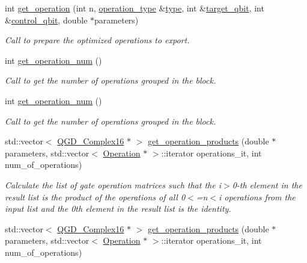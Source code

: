 \begin{DoxyCompactItemize}
int \hyperlink{class_decomposition___base_a64e2b692d38fe3ccbd49708d8fa24493}{get\+\_\+operation} (int n, \hyperlink{operations_2include_2_operation_8h_ad99e62941c8e4b13e5fc45ecaaf65eff}{operation\+\_\+type} \&\hyperlink{class_operation_ad47c56c86d62a4c775571e1600416479}{type}, int \&\hyperlink{class_operation_a3e489b72c124b494777c71b1646bb1e9}{target\+\_\+qbit}, int \&\hyperlink{class_operation_a9a798ea8adec5a45fd2ca07996da88e1}{control\+\_\+qbit}, double $\ast$parameters)
\begin{DoxyCompactList}\small\item\em Call to prepare the optimized operations to export. \end{DoxyCompactList}\item 
int \hyperlink{class_operation__block_a27592a2d25c7e74416de2b9d7997efca}{get\+\_\+operation\+\_\+num} ()
\begin{DoxyCompactList}\small\item\em Call to get the number of operations grouped in the block. \end{DoxyCompactList}\item 
int \hyperlink{class_operation__block_a27592a2d25c7e74416de2b9d7997efca}{get\+\_\+operation\+\_\+num} ()
\begin{DoxyCompactList}\small\item\em Call to get the number of operations grouped in the block. \end{DoxyCompactList}\item 
std\+::vector$<$ \hyperlink{struct_q_g_d___complex16}{Q\+G\+D\+\_\+\+Complex16} $\ast$ $>$ \hyperlink{class_decomposition___base_a7e6efc3b157653de20275e234d4df3d9}{get\+\_\+operation\+\_\+products} (double $\ast$parameters, std\+::vector$<$ \hyperlink{class_operation}{Operation} $\ast$ $>$\+::iterator operations\+\_\+it, int num\+\_\+of\+\_\+operations)
\begin{DoxyCompactList}\small\item\em Calculate the list of gate operation matrices such that the i$>$0-\/th element in the result list is the product of the operations of all 0$<$=n$<$i operations from the input list and the 0th element in the result list is the identity. \end{DoxyCompactList}\item 
std\+::vector$<$ \hyperlink{struct_q_g_d___complex16}{Q\+G\+D\+\_\+\+Complex16} $\ast$ $>$ \hyperlink{class_decomposition___base_a7f3fd202c32e65cbc312ec61d426442a}{get\+\_\+operation\+\_\+products} (double $\ast$parameters, std\+::vector$<$ \hyperlink{class_operation}{Operation} $\ast$ $>$\+::iterator operations\+\_\+it, int num\+\_\+of\+\_\+operations)

\end{DoxyCompactItemize}
